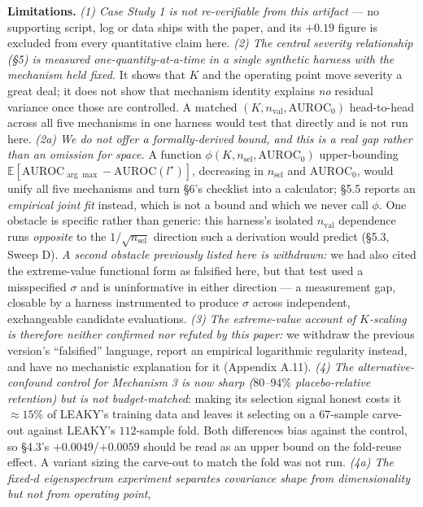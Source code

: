 \documentclass[10pt]{article} %
\begin{document}
\textbf{Limitations.} \emph{(1) Case Study 1 is not re-verifiable from this
artifact} --- no supporting script, log or data ships with the paper, and its
$+0.19$ figure is excluded from every quantitative claim here. \emph{(2) The
central severity relationship (§5) is measured one-quantity-at-a-time in a
single synthetic harness with the mechanism held fixed.} It shows that $K$ and
the operating point move severity a great deal; it does not show that mechanism
identity explains \emph{no} residual variance once those are controlled. A
matched $(K, n_{\text{val}}, \text{AUROC}_0)$ head-to-head across all five
mechanisms in one harness would test that directly and is not run here.
\emph{(2a) We do not offer a formally-derived bound, and this is a real gap
rather than an omission for space.} A function
$\phi(K, n_{\text{sel}}, \text{AUROC}_0)$ upper-bounding
$\mathbb{E}[\text{AUROC}_{\arg\max}-\text{AUROC}(l^\star)]$, decreasing in
$n_{\text{sel}}$ and $\text{AUROC}_0$, would unify all five mechanisms and turn
§6's checklist into a calculator; §5.5 reports an \emph{empirical joint fit}
instead, which is not a bound and which we never call $\phi$. One obstacle is
specific rather than generic: this harness's isolated $n_{\text{val}}$
dependence runs \emph{opposite} to the $1/\sqrt{n_{\text{sel}}}$ direction such
a derivation would predict (§5.3, Sweep D). \emph{A second obstacle previously
listed here is withdrawn:} we had also cited the extreme-value functional form
as falsified here, but that test used a misspecified $\sigma$ and is
uninformative in either direction --- a measurement gap, closable by a harness
instrumented to produce $\sigma$ across independent, exchangeable candidate
evaluations. \emph{(3) The extreme-value account of $K$-scaling is therefore
neither confirmed nor refuted by this paper:} we withdraw the previous
version's ``falsified'' language, report an empirical logarithmic regularity
instead, and have no mechanistic explanation for it (Appendix A.11).
\emph{(4) The alternative-confound control for Mechanism 3 is now sharp
($80$--$94\%$ placebo-relative retention) but is not budget-matched}: making its
selection signal honest costs it $\approx15\%$ of LEAKY's training data and
leaves it selecting on a $67$-sample carve-out against LEAKY's $112$-sample
fold. Both differences bias against the control, so §4.3's $+0.0049$/$+0.0059$
should be read as an upper bound on the fold-reuse effect. A variant sizing the
carve-out to match the fold was not run. \emph{(4a) The fixed-$d$ eigenspectrum experiment
separates covariance shape from dimensionality but not from operating point},
\end{document}
